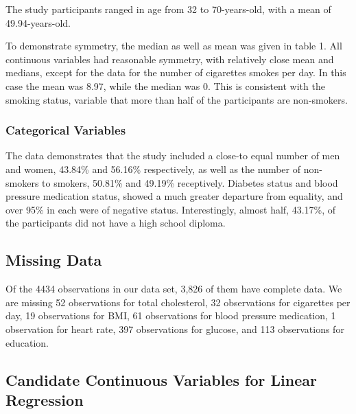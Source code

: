 \documentclass{article}\usepackage[]{graphicx}\usepackage[]{color}
\begin{document}
The study participants ranged in age from 32 to 70-years-old, with a mean of 49.94-years-old.

To demonstrate symmetry, the median as well as mean was given in table 1.  All continuous variables had reasonable symmetry, with relatively close mean and medians, except for the data for the number of cigarettes smokes per day.  In this case the mean was 8.97, while the median was 0.  This is consistent with the smoking status, variable that more than half of the participants are non-smokers.

\subsubsection*{Categorical Variables}

The data demonstrates that the study included a close-to equal number of men and women, 43.84\% and 56.16\% respectively, as well as the number of non-smokers to smokers, 50.81\% and 49.19\% receptively.  Diabetes status and blood pressure medication status, showed a much greater departure from equality, and over 95\% in each were of negative status. Interestingly, almost half, 43.17\%, of the participants did not have a high school diploma.   






\subsection{Missing Data}




Of the 4434 observations in our data set, 3,826 of them have complete data. We are missing 52 observations for total cholesterol, 32 observations for cigarettes per day, 19 observations for BMI, 61 observations for blood pressure medication, 1 observation for heart rate, 397 observations for glucose, and 113 observations for education.

\subsection{Candidate Continuous Variables for Linear Regression}
\end{document}

